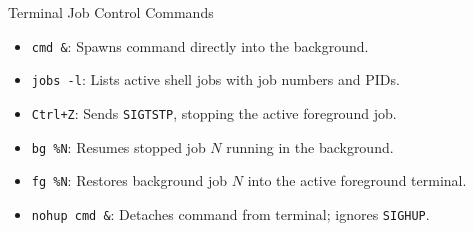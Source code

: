 \begin{cheatbox}{Terminal Job Control Commands}
\begin{itemize}[leftmargin=1.5em]
    \item \texttt{cmd \&}: Spawns command directly into the background.
    \item \texttt{jobs -l}: Lists active shell jobs with job numbers and PIDs.
    \item \texttt{Ctrl+Z}: Sends \texttt{SIGTSTP}, stopping the active foreground job.
    \item \texttt{bg \%N}: Resumes stopped job $N$ running in the background.
    \item \texttt{fg \%N}: Restores background job $N$ into the active foreground terminal.
    \item \texttt{nohup cmd \&}: Detaches command from terminal; ignores \texttt{SIGHUP}.
\end{itemize}
\end{cheatbox}
